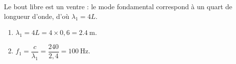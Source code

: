 \documentclass[11pt,a4paper]{article}
\begin{document}
\begin{corrige}
Le bout libre est un ventre : le mode fondamental correspond à un quart de longueur d'onde,
d'où $\lambda_1=4L$.
\begin{enumerate}[label=\alph*)]
  \item $\lambda_1=4L=4\times 0{,}6=\SI{2.4}{\metre}.$
  \item $f_1=\dfrac{c}{\lambda_1}=\dfrac{240}{2{,}4}=\SI{100}{\hertz}.$
\end{enumerate}
\end{corrige}
\end{document}
